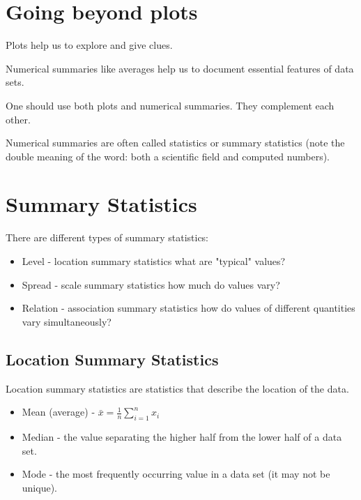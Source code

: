 %

\section{Going beyond plots}
Plots help us to explore and give clues.

Numerical summaries like averages help us to document essential features of
data sets.

One should use both plots and numerical summaries. They complement each
other.

Numerical summaries are often called statistics or summary statistics (note the
double meaning of the word: both a scientific field and computed numbers).

\section{Summary Statistics}
There are different types of summary statistics:
\begin{itemize}
    \item Level - location summary statistics \textrightarrow what are "typical" values?
    \item Spread - scale summary statistics \textrightarrow how much do values vary?
    \item Relation - association summary statistics \textrightarrow how do values of different quantities vary simultaneously?
\end{itemize}


\subsection{Location Summary Statistics}
\begin{definition}
    Location summary statistics are statistics that describe the location of the data.
    \begin{itemize}
        \item Mean (average) - $ \bar{x} = \displaystyle\frac{1}{n}\sum_{i=1}^{n}x_i $
        \item Median - the value separating the higher half from the lower half of a data set.
        \item Mode - the most frequently occurring value in a data set (it may not be unique).
    \end{itemize}
\end{definition}

